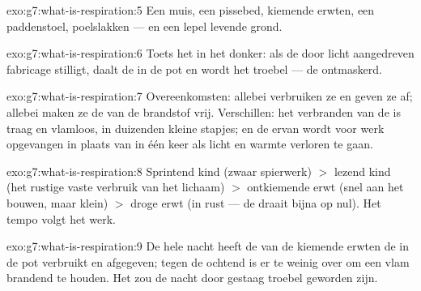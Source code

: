 \begin{solution}{exo:g7:what-is-respiration:5}
Een muis, een pissebed, kiemende erwten, een paddenstoel, poelslakken ---
en een lepel levende grond.
\end{solution}

\begin{solution}{exo:g7:what-is-respiration:6}
Toets het in het donker: als de door licht aangedreven fabricage stilligt,
daalt de  in de pot en wordt het  troebel --- de
 ontmaskerd.
\end{solution}

\begin{solution}{exo:g7:what-is-respiration:7}
Overeenkomsten: allebei verbruiken ze  en geven ze
 af; allebei maken ze de  van de brandstof vrij.
Verschillen: het verbranden van de  is traag en vlamloos, in duizenden
kleine stapjes; en de  ervan wordt voor werk opgevangen in plaats
van in één keer als licht en warmte verloren te gaan.
\end{solution}

\begin{solution}{exo:g7:what-is-respiration:8}
Sprintend kind (zwaar spierwerk) $>$ lezend kind (het rustige vaste
verbruik van het lichaam) $>$ ontkiemende erwt (snel aan het bouwen, maar
klein) $>$ droge erwt (in rust --- de  draait bijna op nul).
Het tempo volgt het werk.
\end{solution}

\begin{solution}{exo:g7:what-is-respiration:9}
De hele nacht heeft de  van de kiemende erwten de  in
de pot verbruikt en  afgegeven; tegen de ochtend is er te
weinig  over om een vlam brandend te houden. Het  zou de
nacht door gestaag troebel geworden zijn.
\end{solution}


